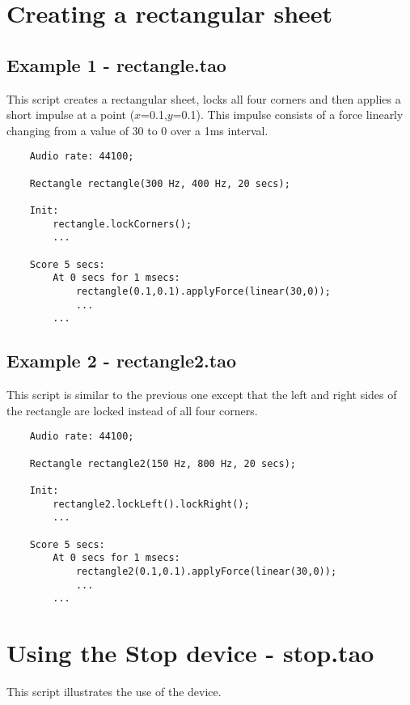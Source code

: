 \section{Creating a rectangular sheet}
\subsection{Example 1 - rectangle.tao} 
This script creates a rectangular sheet, locks all four corners and
then applies a short impulse at a point ($x$=0.1,$y$=0.1). This impulse
consists of a force linearly changing from a value of 30 to 0 over a
1ms interval.

\begin{verbatim}
    Audio rate: 44100;
        
    Rectangle rectangle(300 Hz, 400 Hz, 20 secs);
        
    Init:
        rectangle.lockCorners();
        ...
        
    Score 5 secs:
        At 0 secs for 1 msecs:
            rectangle(0.1,0.1).applyForce(linear(30,0));
            ...
        ...
\end{verbatim}
 
\subsection{Example 2 - rectangle2.tao}
This script is similar to the previous one except that the left and
right sides of the rectangle are locked instead of all four corners.

\begin{verbatim}
    Audio rate: 44100;
        
    Rectangle rectangle2(150 Hz, 800 Hz, 20 secs);
        
    Init:
        rectangle2.lockLeft().lockRight();
        ...
        
    Score 5 secs:
        At 0 secs for 1 msecs:
            rectangle2(0.1,0.1).applyForce(linear(30,0));
            ...
        ...
\end{verbatim}
 
\section{Using the Stop device - stop.tao}
This script illustrates the use of the  device.

